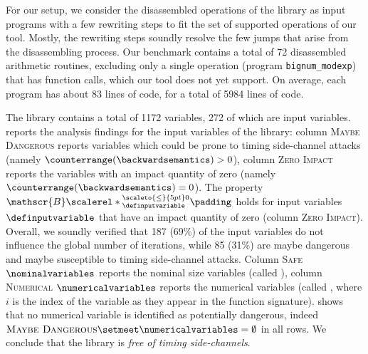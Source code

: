 For our setup, we consider the disassembled operations of the \bignum{} library as input programs with a few rewriting steps to fit the set of supported operations of our tool.
Mostly, the rewriting steps soundly resolve the few jumps that arise from the disassembling process.
Our benchmark contains a total of 72 disassembled arithmetic routines, excluding only a single operation (program \texttt{bignum\_modexp}) that has function calls, which our tool does not yet support.
On average, each program has about 83 lines of code, for a total of 5984 lines of code.



%
The library contains a total of 1172 variables, 272 of which are input variables.
 reports the analysis findings for the input variables of the \bignum{} library: column \textsc{Maybe Dangerous} reports variables which could be prone to timing side-channel attacks (namely $\counterrange(\backwardsemantics) > 0$),
column \textsc{Zero Impact} reports the variables with an impact quantity of zero (namely $\counterrange(\backwardsemantics) = 0$).
The property $\mathscr{B}\scalerel*{\vphantom{}^{{\scaleto{\le}{5pt}0}}_{\definputvariable}}{\padding}$ holds for input variables $\definputvariable$ that have an impact quantity of zero (column \textsc{Zero Impact}).
Overall, we soundly verified that 187 (69\%) of the input variables do not influence the global number of iterations, while 85 (31\%) are maybe dangerous and maybe susceptible to timing side-channel attacks.
%
Column \textsc{Safe} $\nominalvariables$ reports the nominal size variables (called ), column \textsc{Numerical} $\numericalvariables$ reports the numerical variables (called , where $i$ is the index of the variable as they appear in the function signature).
 shows that no numerical variable is identified as potentially dangerous, indeed $\textsc{Maybe Dangerous} \setmeet \numericalvariables = \emptyset$ in all rows.
We conclude that the \bignum{} library is \emph{free of timing side-channels}.


